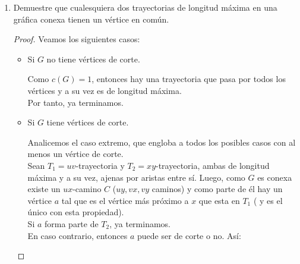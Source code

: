 \documentclass{article}
\begin{document}
\begin{enumerate}
\begin{proof}
    Sea $G$ una gráfica completa, entonces $P_{3}$ es subgráfica de $G$. Para este
    ejercicio necesitamos de una condición, $V_G \ge 3$, para las gráficas que no
    cumplan esto se tendrá la demostración por vacuidad.

    Tomemos a $x_{i - 1}, x_{i}, x_{i + 1}$ en $V_{G}$ ($2 \ge i \ge
    |V_{G}| - 1$), como $G$ es completa se tiene que la distancia entre cualesquiera
    $2$ v\'ertices es $1$, luego tenemos que hay ${3 \choose 2}$ aristas!! y esto es
    claramente mayor que $2$ ($|E_{P_3}|$), como los v\'ertices que tomamos son arbitrarios,
    podemos concluir que $P_{3} \nsubseteq G$.

    Como la anterior contradicci\'on resulta de suponer a $G$ completa, podemos
    asegurar que si $G$ no es completa, entonces $P_3 \subseteq G$.
  \end{proof}
\item Demuestre que cualesquiera dos trayectorias de longitud m\'axima en una
  gr\'afica conexa tienen un vértice en común.

  \begin{proof}
      Veamos los siguientes casos:

      \begin{itemize}
        \item Si $G$ no tiene vértices de corte.

          Como $c(G) = 1$, entonces hay una trayectoria que pasa por todos los vértices
          y a su vez es de longitud máxima. \\
          Por tanto, ya terminamos.

        \item Si $G$ tiene vértices de corte.

          Analicemos el caso extremo, que engloba a todos los posibles casos con al menos
          un vértice de corte. \\
          Sean $T_{1} = uv$-trayectoria y $T_{2} = xy$-trayectoria, ambas de longitud
          máxima y a su vez, ajenas por aristas entre sí. Luego, como $G$ es conexa existe
          un $ux$-camino $C$ ($uy, vx, vy$ caminos) y como parte de él hay un vértice $a$
          tal que es el vértice más próximo a $x$ que esta en $T_{1}$ ( y es el único con esta
          propiedad). \\
          Si $a$ forma parte de $T_{2}$, ya terminamos. \\
          En caso contrario, entonces $a$ puede ser de corte o no. Así:


\end{itemize}
\end{proof}
\end{enumerate}
\end{document}
